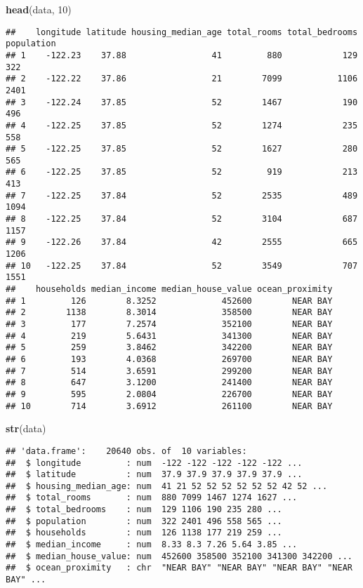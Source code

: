 \documentclass[
]{article}
\newenvironment{Shaded}{\begin{snugshade}}{\end{snugshade}}
\newcommand{\DecValTok}[1]{\textcolor[rgb]{0.00,0.00,0.81}{#1}}
\newcommand{\KeywordTok}[1]{\textcolor[rgb]{0.13,0.29,0.53}{\textbf{#1}}}
\newcommand{\NormalTok}[1]{#1}
\begin{document}
\begin{Shaded}
\begin{Highlighting}[]
\KeywordTok{head}\NormalTok{(data, }\DecValTok{10}\NormalTok{)}
\end{Highlighting}
\end{Shaded}

\begin{verbatim}
##    longitude latitude housing_median_age total_rooms total_bedrooms population
## 1    -122.23    37.88                 41         880            129        322
## 2    -122.22    37.86                 21        7099           1106       2401
## 3    -122.24    37.85                 52        1467            190        496
## 4    -122.25    37.85                 52        1274            235        558
## 5    -122.25    37.85                 52        1627            280        565
## 6    -122.25    37.85                 52         919            213        413
## 7    -122.25    37.84                 52        2535            489       1094
## 8    -122.25    37.84                 52        3104            687       1157
## 9    -122.26    37.84                 42        2555            665       1206
## 10   -122.25    37.84                 52        3549            707       1551
##    households median_income median_house_value ocean_proximity
## 1         126        8.3252             452600        NEAR BAY
## 2        1138        8.3014             358500        NEAR BAY
## 3         177        7.2574             352100        NEAR BAY
## 4         219        5.6431             341300        NEAR BAY
## 5         259        3.8462             342200        NEAR BAY
## 6         193        4.0368             269700        NEAR BAY
## 7         514        3.6591             299200        NEAR BAY
## 8         647        3.1200             241400        NEAR BAY
## 9         595        2.0804             226700        NEAR BAY
## 10        714        3.6912             261100        NEAR BAY
\end{verbatim}

\begin{Shaded}
\begin{Highlighting}[]
\KeywordTok{str}\NormalTok{(data)}
\end{Highlighting}
\end{Shaded}

\begin{verbatim}
## 'data.frame':    20640 obs. of  10 variables:
##  $ longitude         : num  -122 -122 -122 -122 -122 ...
##  $ latitude          : num  37.9 37.9 37.9 37.9 37.9 ...
##  $ housing_median_age: num  41 21 52 52 52 52 52 52 42 52 ...
##  $ total_rooms       : num  880 7099 1467 1274 1627 ...
##  $ total_bedrooms    : num  129 1106 190 235 280 ...
##  $ population        : num  322 2401 496 558 565 ...
##  $ households        : num  126 1138 177 219 259 ...
##  $ median_income     : num  8.33 8.3 7.26 5.64 3.85 ...
##  $ median_house_value: num  452600 358500 352100 341300 342200 ...
##  $ ocean_proximity   : chr  "NEAR BAY" "NEAR BAY" "NEAR BAY" "NEAR BAY" ...
\end{verbatim}
\end{document}
